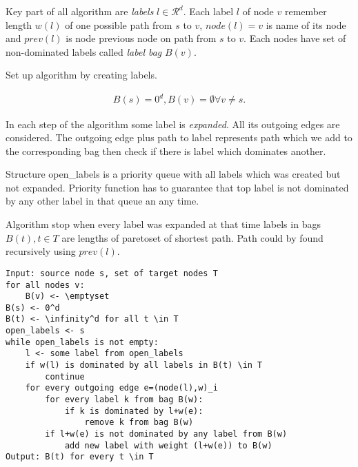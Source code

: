 Key part of all algorithm are \emph{labels} $l\in \mathcal{R}^d$.
Each label $l$ of node $v$ remember length $w(l)$  of one 
possible path from $s$ to $v$, $node(l) = v$ is name of its node
and $prev(l)$ is node previous node on path from $s$ to $v$.
Each nodes have set of non-dominated labels called \emph{label bag} $B(v)$.

Set up algorithm by creating labels.

\begin{gather*} 
B(s)=0^d, B(v)=\emptyset \forall v \ne s.
\end{gather*} 

In each step of the algorithm some label is \emph{expanded}. 
All its outgoing edges are considered. 
The outgoing edge plus path to label represents 
path which we add to the corresponding bag then check if there
is label which dominates another.

Structure open\_labels is a priority queue with all labels which was created but not expanded.
Priority function has to guarantee that top label is not dominated by any other label in that
queue an any time.

Algorithm stop when every label was expanded at that time
labels in bags $B(t), t \in T$ are lengths of paretoset of shortest path.
Path could by found recursively using $prev(l)$.


\begin{lstlisting}[caption={MLS Algorithm},label=list:8-6,captionpos=t,float,abovecaptionskip=-\medskipamount]
Input: source node s, set of target nodes T
for all nodes v:
	B(v) <- \emptyset
B(s) <- 0^d
B(t) <- \infinity^d for all t \in T
open_labels <- s
while open_labels is not empty:
	l <- some label from open_labels
    if w(l) is dominated by all labels in B(t) \in T
    	continue
    for every outgoing edge e=(node(l),w)_i
    	for every label k from bag B(w):
        	if k is dominated by l+w(e):
            	remove k from bag B(w)
        if l+w(e) is not dominated by any label from B(w)
        	add new label with weight (l+w(e)) to B(w)
Output: B(t) for every t \in T
\end{lstlisting}
